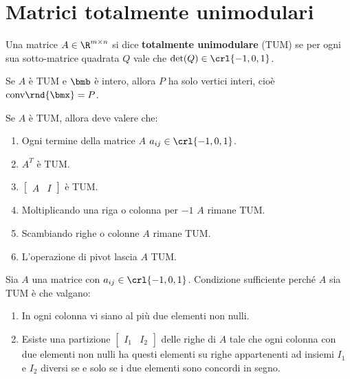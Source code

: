 \documentclass[\main/main.tex]{subfiles}
\begin{document}
\section{Matrici totalmente unimodulari}

\begin{definition}
  Una matrice $A \in \R^{m \times n}$ si dice \textbf{totalmente unimodulare} (TUM) se per ogni sua sotto-matrice quadrata $Q$ vale che $\det(Q) \in \crl{-1, 0, 1}$.
\end{definition}

\begin{theorem}
  Se $A$ è TUM e $\bmb$ è intero, allora $P$ ha solo vertici interi, cioè $\text{conv}\rnd{\bmx} = P$.
\end{theorem}

\begin{theorem}
  Se $A$ è TUM, allora deve valere che:
  \begin{enumerate}
    \item Ogni termine della matrice $A$ $a_{ij} \in \crl{-1,0,1}$.
    \item $A^T$ è TUM.
    \item $\begin{bmatrix}
              A & I
            \end{bmatrix}$ è TUM.
    \item Moltiplicando una riga o colonna per $-1$ $A$ rimane TUM.
    \item Scambiando righe o colonne $A$ rimane TUM.
    \item L'operazione di pivot lascia $A$ TUM.
  \end{enumerate}
\end{theorem}

\begin{theorem}
  Sia $A$ una matrice con $a_{ij} \in \crl{-1,0,1}$. Condizione sufficiente perché $A$ sia TUM è che valgano:
  \begin{enumerate}
    \item In ogni colonna vi siano al più due elementi non nulli.
    \item Esiste una partizione $\begin{bmatrix}
              I_1 & I_2
            \end{bmatrix}$ delle righe di $A$ tale che ogni colonna con due elementi non nulli ha questi elementi su righe appartenenti ad insiemi $I_1$ e $I_2$ diversi se e solo se i due elementi sono concordi in segno.
  \end{enumerate}
\end{theorem}
\end{document}
